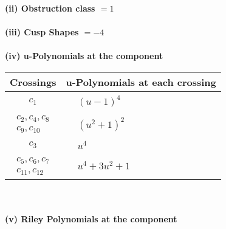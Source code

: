 \documentclass[1p]{elsarticle_modified}
\theoremstyle{definition}
\begin{document}
\flushleft \textbf{(ii) Obstruction class $= 1$}\\~\\
\flushleft \textbf{(iii) Cusp Shapes $= -4$}\\~\\
\newpage\renewcommand{\arraystretch}{1}
\flushleft \textbf{(iv) u-Polynomials at the component}\newline \\
\begin{tabular}{m{50pt}|m{274pt}}
Crossings & \hspace{64pt}u-Polynomials at each crossing \\
\hline $$\begin{aligned}c_{1}\end{aligned}$$&$\begin{aligned}
&(u-1)^4
\end{aligned}$\\
\hline $$\begin{aligned}c_{2},c_{4},c_{8}\\c_{9},c_{10}\end{aligned}$$&$\begin{aligned}
&(u^2+1)^2
\end{aligned}$\\
\hline $$\begin{aligned}c_{3}\end{aligned}$$&$\begin{aligned}
&u^4
\end{aligned}$\\
\hline $$\begin{aligned}c_{5},c_{6},c_{7}\\c_{11},c_{12}\end{aligned}$$&$\begin{aligned}
&u^4+3 u^2+1
\end{aligned}$\\
\hline
\end{tabular}\\~\\
\newpage\renewcommand{\arraystretch}{1}
\flushleft \textbf{(v) Riley Polynomials at the component}\newline \\
\end{document}

